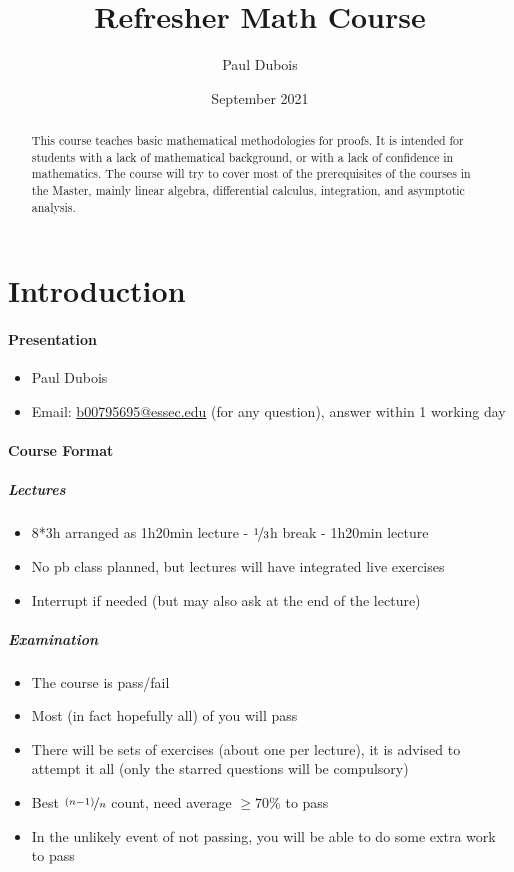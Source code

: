 \documentclass[11pt,a4paper]{report}
\title{Refresher Math Course}
\author{Paul Dubois}
\date{September 2021}
\begin{document}
	\maketitle
	
	\begin{abstract}
		This course teaches basic mathematical methodologies for proofs.
		It is intended for students with a lack of mathematical background, or with a lack of confidence in mathematics.
		The course will try to cover most of the prerequisites of the courses in the Master, mainly linear algebra, differential calculus, integration, and asymptotic analysis.
	\end{abstract}

	\tableofcontents
	\newpage
	
	\section*{Introduction}
	\paragraph{Presentation}
	\begin{itemize}
		\item Paul Dubois
		\item Email: \href{mailto:b00795695@essec.edu}{b00795695@essec.edu} (for any question), answer within 1 working day
	\end{itemize}
	\paragraph{Course Format}
	\subparagraph{Lectures}
	\begin{itemize}
		\item 8*3h arranged as 1h20min lecture - $\nicefrac{1}{3}$h break - 1h20min lecture
		\item No pb class planned, but lectures will have integrated live exercises
		\item Interrupt if needed (but may also ask at the end of the lecture)
	\end{itemize}
	\subparagraph{Examination}
	\begin{itemize}
		\item The course is pass/fail
		\item Most (in fact hopefully all) of you will pass
		\item There will be sets of exercises (about one per lecture), it is advised to attempt it all (only the starred questions will be compulsory)
		\item Best $\nicefrac{(n-1)}{n}$ count, need average $\geq 70 \%$ to pass
		\item In the unlikely event of not passing, you will be able to do some extra work to pass
	\end{itemize}
\end{document}
